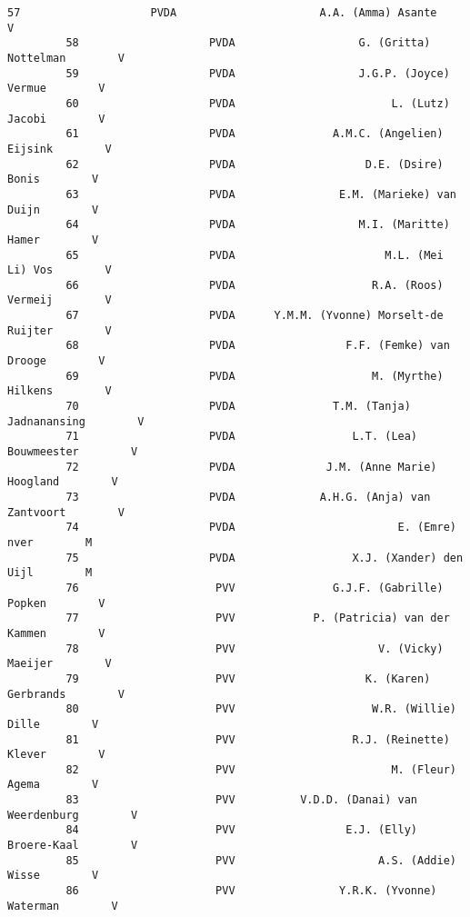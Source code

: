\documentclass{article}
\begin{document}
\begin{Verbatim}[commandchars=\\\{\}]
         57                    PVDA                      A.A. (Amma) Asante        V   
         58                    PVDA                   G. (Gritta) Nottelman        V   
         59                    PVDA                   J.G.P. (Joyce) Vermue        V   
         60                    PVDA                        L. (Lutz) Jacobi        V   
         61                    PVDA               A.M.C. (Angelien) Eijsink        V   
         62                    PVDA                    D.E. (Dsire) Bonis        V   
         63                    PVDA                E.M. (Marieke) van Duijn        V   
         64                    PVDA                   M.I. (Maritte) Hamer        V   
         65                    PVDA                       M.L. (Mei Li) Vos        V   
         66                    PVDA                     R.A. (Roos) Vermeij        V   
         67                    PVDA      Y.M.M. (Yvonne) Morselt-de Ruijter        V   
         68                    PVDA                 F.F. (Femke) van Drooge        V   
         69                    PVDA                     M. (Myrthe) Hilkens        V   
         70                    PVDA               T.M. (Tanja) Jadnanansing        V   
         71                    PVDA                  L.T. (Lea) Bouwmeester        V   
         72                    PVDA              J.M. (Anne Marie) Hoogland        V   
         73                    PVDA             A.H.G. (Anja) van Zantvoort        V   
         74                    PVDA                         E. (Emre) nver        M   
         75                    PVDA                  X.J. (Xander) den Uijl        M   
         76                     PVV               G.J.F. (Gabrille) Popken        V   
         77                     PVV            P. (Patricia) van der Kammen        V   
         78                     PVV                      V. (Vicky) Maeijer        V   
         79                     PVV                    K. (Karen) Gerbrands        V   
         80                     PVV                     W.R. (Willie) Dille        V   
         81                     PVV                  R.J. (Reinette) Klever        V   
         82                     PVV                        M. (Fleur) Agema        V   
         83                     PVV          V.D.D. (Danai) van Weerdenburg        V   
         84                     PVV                 E.J. (Elly) Broere-Kaal        V   
         85                     PVV                      A.S. (Addie) Wisse        V   
         86                     PVV                Y.R.K. (Yvonne) Waterman        V   

\end{Verbatim}
\end{document}
